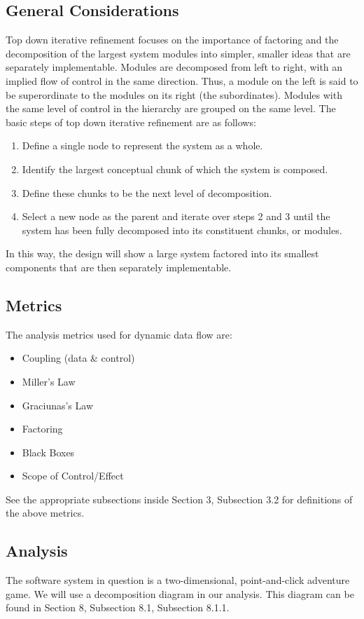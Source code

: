\documentclass{article}
\begin{document}
	\subsection{General Considerations}
		Top down iterative refinement focuses on the importance of factoring and the decomposition of the largest system modules into simpler, smaller ideas that are separately implementable. Modules are decomposed from left to right, with an implied flow of control in the same direction. Thus, a module on the left is said to be superordinate to the modules on its right (the subordinates). Modules with the same level of control in the hierarchy are grouped on the same level. The basic steps of top down iterative refinement are as follows:
		\begin{enumerate}
			\item Define a single node to represent the system as a whole.
			\item Identify the largest conceptual chunk of which the system is composed. 
			\item Define these chunks to be the next level of decomposition. 
			\item Select a new node as the parent and iterate over steps 2 and 3 until the system has been fully decomposed into its constituent chunks, or modules. 
		\end{enumerate}
		In this way, the design will show a large system factored into its smallest components that are then separately implementable. 
	\subsection{Metrics}
		The analysis metrics used for dynamic data flow are:
			\begin{itemize}
				\item Coupling (data \& control)
				\item Miller's Law
				\item Graciunas's Law
				\item Factoring
				\item Black Boxes
				\item Scope of Control/Effect
			\end{itemize}
		See the appropriate subsections inside Section 3, Subsection 3.2 for definitions of the above metrics. 
	\subsection{Analysis}
		The software system in question is a two-dimensional, point-and-click adventure game. We will use a decomposition diagram in our analysis. This diagram can be found in Section 8, Subsection 8.1, Subsection 8.1.1. 
\end{document}
